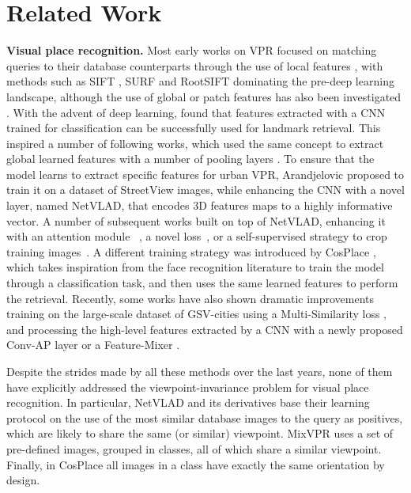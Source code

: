 \documentclass[10pt,twocolumn,letterpaper]{article}
\newcommand{\myparagraph}[1]{\vspace{4pt}\noindent\textbf{#1}}
\begin{document}
\section{Related Work}
\label{sec:related_work}
\myparagraph{Visual place recognition.} Most early works on VPR focused on matching queries to their database counterparts through the use of local features \cite{Torii_2015}, with methods such as SIFT \cite{Lowe_2004_sift}, SURF \cite{Bay_2008_surf} and RootSIFT \cite{Arandjelovic_2012_rootSift} dominating the pre-deep learning landscape, although the use of global or patch features has also been investigated \cite{Oliva_2006_gist}.
With the advent of deep learning, \cite{Babenko_2014_neural_codes} found that features extracted with a CNN trained for classification can be successfully used for landmark retrieval.
This inspired a number of following works, which used the same concept to extract global learned features with a number of pooling layers \cite{Razavian_2015_mac, Tolias_2016_rmac,Radenovic_2019_gem}.
To ensure that the model learns to extract specific features for urban VPR, 
Arandjelovic \etal \cite{Arandjelovic_2018_netvlad} proposed to train it on a dataset of StreetView images, while enhancing the CNN with a novel layer, named NetVLAD, that encodes 3D features maps to a highly informative vector.
A number of subsequent works built on top of NetVLAD, enhancing it with an attention module~ \cite{Kim_2017_crn}, a novel loss~\cite{Liu_2019_sare}, or a  self-supervised strategy to crop training images~\cite{Ge_2020_sfrs}.
A different training strategy was introduced by CosPlace \cite{Berton_2022_cosPlace}, which takes inspiration from the face recognition literature \cite{Liu_2017_sphereface, Wang_2018_cosFace, Deng_2019_arcFace} to train the model through a classification task, and then uses the same learned features to perform the retrieval.
Recently, some works have also shown dramatic improvements training on the large-scale dataset of GSV-cities \cite{Alibey_2022_gsvcities} using a Multi-Similarity loss \cite{Wang_2019_multi_similarity_loss}, and processing the high-level features extracted by a CNN with a newly proposed Conv-AP layer \cite{Alibey_2022_gsvcities} or a Feature-Mixer \cite{Alibey_2023_mixvpr}.


Despite the strides made by all these methods over the last years, none of them have explicitly addressed the viewpoint-invariance problem for visual place recognition.
In particular, NetVLAD and its derivatives base their learning protocol on the use of the most similar database images to the query as positives, which are likely to share the same (or similar) viewpoint. 
MixVPR \cite{Alibey_2023_mixvpr} uses a set of pre-defined images, grouped in classes, all of which share a similar viewpoint. Finally, in CosPlace all images in a class have exactly the same orientation by design.
\end{document}
